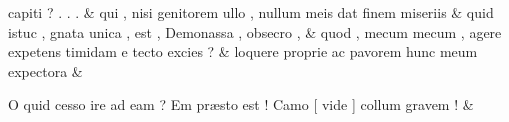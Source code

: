 \documentclass[12pt,onecolumn,twoside,a4paper]{memoir}
\begin{document}
\begin{pairs}
\begin{Leftside}
                              capiti
                              ?
                              .
                              .
                              . \&
                         \stanza {}
                     qui
                              ,
                              nisi
                              genitorem
                              ullo
                              ,
                              nullum
                              meis
                              dat
                              finem
                              miseriis \&
                         \stanza {}quid
                              istuc
                              ,
                              gnata
                              unica
                              ,
                              est
                              ,
                              Demonassa
                              ,
                              obsecro
                              , & 
                     quod
                              ,
                              mecum
                              {mecum}
                              ,
                              agere
                              expetens
                              timidam
                              e
                              tecto
                              excies
                              ? \&
                         \stanza {}
                     loquere
                              proprie
                              ac
                              pavorem
                              hunc
                              meum
                              expectora \&
                         \stanza {}
                     
                              O
                              quid
                              cesso
                              ire
                              ad
                              eam
                              ?
                              Em
                              præsto
                              est
                              !
                              Camo
                              [
                              vide
                              ]
                              collum
                              gravem
                              ! \&
                         \stanza {}
                     

\end{Leftside}
\end{pairs}
\end{document}
